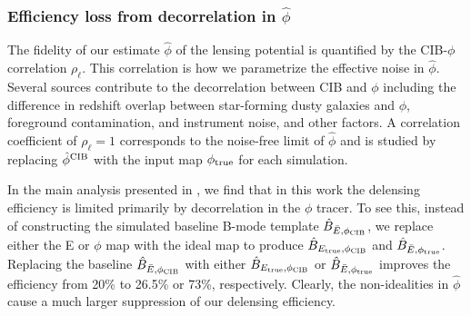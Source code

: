 \begin{table}
\vspace{0.2cm}
\label{tab:eff_future}
\end{table}

\subsubsection{Efficiency loss from decorrelation in $\hat{\phi}$}
\label{sec:phidecorr}
The fidelity of our estimate $\hat{\phi}$ of the lensing potential is quantified by the CIB-$\phi$ correlation $\rho_{\ell}$.
This correlation is how we parametrize the effective noise in $\hat{\phi}$.
Several sources contribute to the decorrelation between CIB and $\phi$ including the difference in redshift overlap between star-forming dusty galaxies and $\phi$, foreground contamination, and instrument noise, and other factors.
A correlation coefficient of $\rho_{\ell} = 1$ corresponds to the noise-free limit of $\hat{\phi}$ and is studied by replacing $\hat{\phi}^{\rm{CIB}}$ with the input map  $\phi_{\rm true}$ for each simulation.

In the main analysis presented in , we find that in this work the delensing efficiency is limited primarily by decorrelation in the $\phi$ tracer.
To see this, instead of constructing the simulated baseline B-mode template $\hat{B}_{\bar{E}, \phi_{\rm CIB}}$,
we replace either the E or $\phi$ map with the ideal map to produce $\hat{B}_{E_{\rm true}, \phi_{\rm CIB}}$ and $\hat{B}_{\bar{E}, \phi_{\rm true}}$.
Replacing the baseline $\hat{B}_{\bar{E}, \phi_{\rm CIB}}$ with either $\hat{B}_{E_{\rm true}, \phi_{\rm CIB}}$ or $\hat{B}_{\bar{E}, \phi_{\rm true}}$ improves the efficiency from 20\% to 26.5\% or 73\%, respectively.
Clearly, the non-idealities in $\hat{\phi}$ cause a much larger suppression of our delensing efficiency.

